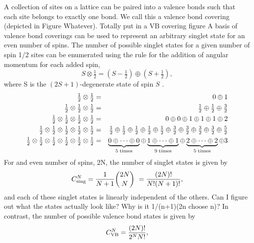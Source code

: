 A collection of sites on a lattice can be paired into a valence bonds such that each site
belongs to exactly one bond.  We call this a valence bond covering (depicted in {\color{red}
Figure Whatever}).  
{\color{red} Totally put in a VB covering figure}
A basis of valence bond coverings can be used to represent an arbitrary singlet state
for an even number of spins.
The number of possible singlet states for a given number of spin 1/2 sites can be enumerated
using the rule for the addition of angular momentum for each added spin,
\begin{equation}
S\otimes \tfrac{1}{2}  = \left(S-\tfrac{1}{2}\right)\oplus\left(S+\tfrac{1}{2}\right),
\end{equation}
where S is the $(2S+1)$-degenerate state of spin $S$ \cite{Beach2006}.
\begin{eqnarray}
\tfrac{1}{2} \otimes \tfrac{1}{2}  &=& 0 \oplus 1\nonumber \\ 
\tfrac{1}{2} \otimes \tfrac{1}{2}  \otimes \tfrac{1}{2} &=& 
	\tfrac{1}{2} \oplus  \tfrac{1}{2} \oplus  \tfrac{3}{2} \nonumber \\
\tfrac{1}{2} \otimes \tfrac{1}{2}  \otimes \tfrac{1}{2} \otimes \tfrac{1}{2} &=& 
	0 \oplus 0 \oplus 1 \oplus 1 \oplus 1 \oplus 2 \nonumber \\
\tfrac{1}{2} \otimes \tfrac{1}{2}  \otimes \tfrac{1}{2}  \otimes \tfrac{1}{2}  \otimes \tfrac{1}{2}&=& 
	\tfrac{1}{2} \oplus \tfrac{1}{2} \oplus \tfrac{1}{2} \oplus \tfrac{1}{2} \oplus \tfrac{1}{2} \oplus  
	\tfrac{3}{2} \oplus \tfrac{3}{2} \oplus \tfrac{3}{2} \oplus \tfrac{3}{2} \oplus
	  \tfrac{5}{2} \nonumber \\
\tfrac{1}{2} \otimes \tfrac{1}{2}  \otimes \tfrac{1}{2} \otimes \tfrac{1}{2} \otimes \tfrac{1}{2}
\otimes \tfrac{1}{2} &=& 
	\underbrace{0 \oplus\cdots \oplus 0}_{5 \rm{\; times}} \oplus 
	\underbrace{1 \oplus \cdots \oplus 1}_{9 \rm{\; times}} \oplus 
	\underbrace{2 \oplus \cdots \oplus 2}_{5 \rm{\; times}} 
	\oplus 3 \nonumber
\end{eqnarray}
For and even number of spins, 2N, the number of singlet states is given by 
\begin{equation}
C_{\rm{sing}}^N = \frac{1}{N+1}\binom{2N}{N}\ = \frac{(2N)!}{N!(N+1)!},
\end{equation}  
and each of these singlet states is linearly independent of the others.
{\color{red} Can I figure out what the states actually look like?  Why is it 1/(n+1)(2n choose n)?}
In contrast, the number of possible valence bond states is given by
\begin{equation}
C_{\rm{VB}}^N =
	\frac{(2N)!}{2^NN!},
\end{equation}
